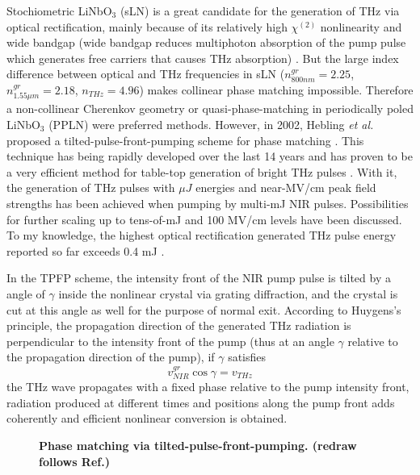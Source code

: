 Stochiometric LiNbO$_{3}$ (sLN) is a great candidate for the generation of THz via optical rectification, mainly because of its relatively high $\chi^{(2)}$ nonlinearity and wide bandgap (wide bandgap reduces multiphoton absorption of the pump pulse which generates free carriers that causes THz absorption) \cite{ORNelsonandHebling}. But the large index difference between optical and THz frequencies in sLN ($n_{800nm}^{gr} = 2.25$, $n_{1.55\mu m}^{gr} = 2.18$, $n_{THz} = 4.96$) \cite{ORNelsonandHebling} makes collinear phase matching impossible. Therefore a non-collinear Cherenkov geometry \cite{Cherenkov1,Cherenkov2,Cherenkov3} or quasi-phase-matching in periodically poled LiNbO$_{3}$ (PPLN) \cite{PPLN,PPLNtheo,PPLNexp} were preferred methods. However, in 2002, Hebling {\it et al.\@} proposed a tilted-pulse-front-pumping scheme for phase matching \cite{ORoriginal}. This technique has being rapidly developed over the last 14 years and has proven to be a very efficient method for table-top generation of bright THz pulses \cite{ORNelsonandHebling,ORtheo1,ORtheo2,ORtheo3,ORjapan,OR4percent,OR125uJ,OR0.4mJ}. With it, the generation of THz pulses with $\mu J$ energies and near-MV/cm peak field strengths has been achieved when pumping by multi-mJ NIR pulses. Possibilities for further scaling up to tens-of-mJ and 100 MV/cm levels \cite{ORtheo2} have been discussed. To my knowledge, the highest optical rectification generated THz pulse energy reported so far exceeds 0.4 mJ \cite{OR0.4mJ}.

In the TPFP scheme, the intensity front of the NIR pump pulse is tilted by a angle of $\gamma$ inside the nonlinear crystal via grating diffraction, and the crystal is cut at this angle as well for the purpose of normal exit. According to Huygens's principle, the propagation direction of the generated THz radiation is perpendicular to the intensity front of the pump (thus at an angle $\gamma$ relative to the propagation direction of the pump), if $\gamma$ satisfies \cite{ORNelsonandHebling}
\begin{equation}
    v_{NIR}^{gr} \cos \gamma = v_{THz}
\end{equation}
the THz wave propagates with a fixed phase relative to the pump intensity front, radiation produced at different times and positions along the pump front adds coherently and efficient nonlinear conversion is obtained. 

\begin{figure}[H]
	
	\centering
	\caption[Phase matching via tilted-pulse-front pumping.]{{\bf Phase matching via tilted-pulse-front-pumping. (redraw follows Ref.\@ \cite{ORNelsonandHebling})}}
	\label{fig:TPFPprinciple}
	
\end{figure}

